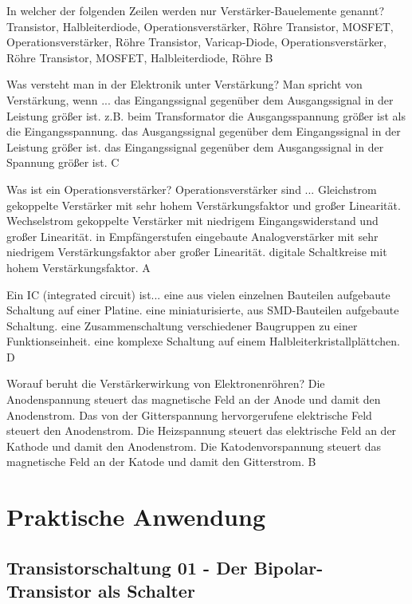 {In welcher der folgenden Zeilen werden nur Verstärker-Bauelemente genannt?}%
{Transistor, Halbleiterdiode, Operationsverstärker, Röhre}%
{Transistor, MOSFET, Operationsverstärker, Röhre}%
{Transistor, Varicap-Diode, Operationsverstärker, Röhre}%
{Transistor, MOSFET, Halbleiterdiode, Röhre}%
{B}%

{Was versteht man in der Elektronik unter Verstärkung? Man spricht von Verstärkung, wenn ...}%
{das Eingangssignal gegenüber dem Ausgangssignal in der Leistung größer ist.}%
{z.B. beim Transformator die Ausgangsspannung größer ist als die Eingangsspannung.}%
{das Ausgangssignal gegenüber dem Eingangssignal in der Leistung größer ist.}%
{das Eingangssignal gegenüber dem Ausgangssignal in der Spannung größer ist.}%
{C}%

{Was ist ein Operationsverstärker? Operationsverstärker sind ...}%
{Gleichstrom gekoppelte Verstärker mit sehr hohem Verstärkungsfaktor und großer Linearität.}%
{Wechselstrom gekoppelte Verstärker mit niedrigem Eingangswiderstand und großer Linearität.}%
{in Empfängerstufen eingebaute Analogverstärker mit sehr niedrigem Verstärkungsfaktor aber großer Linearität.}%
{digitale Schaltkreise mit hohem Verstärkungsfaktor.}%
{A}%

{ Ein IC (integrated circuit) ist...}%
{eine aus vielen einzelnen Bauteilen aufgebaute Schaltung auf einer Platine.}%
{eine miniaturisierte, aus SMD-Bauteilen aufgebaute Schaltung.}%
{eine Zusammenschaltung verschiedener Baugruppen zu einer Funktionseinheit.}%
{eine komplexe Schaltung auf einem Halbleiterkristallplättchen.}%
{D}%

{Worauf beruht die Verstärkerwirkung von Elektronenröhren?}%
{Die Anodenspannung steuert das magnetische Feld an der Anode und damit den Anodenstrom.}%
{Das von der Gitterspannung hervorgerufene elektrische Feld steuert den Anodenstrom.}%
{Die Heizspannung steuert das elektrische Feld an der Kathode und damit den Anodenstrom.}%
{Die Katodenvorspannung steuert das magnetische Feld an der Katode und damit den Gitterstrom.}%
{B}%

\newpage

\section*{Praktische Anwendung}

\subsection*{Transistorschaltung 01 - Der Bipolar-Transistor als Schalter}

